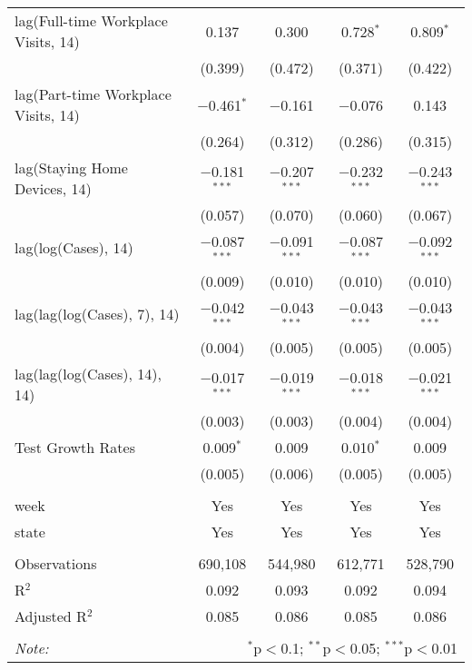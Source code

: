 \begin{tabular}{@{\extracolsep{1pt}}lcccc}
  lag(Full-time Workplace Visits, 14) & 0.137 & 0.300 & 0.728$^{*}$ & 0.809$^{*}$ \\ 
  & (0.399) & (0.472) & (0.371) & (0.422) \\ 
  lag(Part-time Workplace Visits, 14) & $-$0.461$^{*}$ & $-$0.161 & $-$0.076 & 0.143 \\ 
  & (0.264) & (0.312) & (0.286) & (0.315) \\ 
  lag(Staying Home Devices, 14) & $-$0.181$^{***}$ & $-$0.207$^{***}$ & $-$0.232$^{***}$ & $-$0.243$^{***}$ \\ 
  & (0.057) & (0.070) & (0.060) & (0.067) \\ 
  lag(log(Cases), 14) & $-$0.087$^{***}$ & $-$0.091$^{***}$ & $-$0.087$^{***}$ & $-$0.092$^{***}$ \\ 
  & (0.009) & (0.010) & (0.010) & (0.010) \\ 
  lag(lag(log(Cases), 7), 14) & $-$0.042$^{***}$ & $-$0.043$^{***}$ & $-$0.043$^{***}$ & $-$0.043$^{***}$ \\ 
  & (0.004) & (0.005) & (0.005) & (0.005) \\ 
  lag(lag(log(Cases), 14), 14) & $-$0.017$^{***}$ & $-$0.019$^{***}$ & $-$0.018$^{***}$ & $-$0.021$^{***}$ \\ 
  & (0.003) & (0.003) & (0.004) & (0.004) \\ 
  Test Growth Rates & 0.009$^{*}$ & 0.009 & 0.010$^{*}$ & 0.009 \\ 
  & (0.005) & (0.006) & (0.005) & (0.005) \\ 
 \hline \\[-1.8ex] 
week & Yes & Yes & Yes & Yes \\ 
state & Yes & Yes & Yes & Yes \\ 
\hline \\[-1.8ex] 
Observations & 690,108 & 544,980 & 612,771 & 528,790 \\ 
R$^{2}$ & 0.092 & 0.093 & 0.092 & 0.094 \\ 
Adjusted R$^{2}$ & 0.085 & 0.086 & 0.085 & 0.086 \\ 
\hline 
\hline \\[-1.8ex] 
\textit{Note:}  & \multicolumn{4}{r}{$^{*}$p$<$0.1; $^{**}$p$<$0.05; $^{***}$p$<$0.01} \\ 
\end{tabular} 